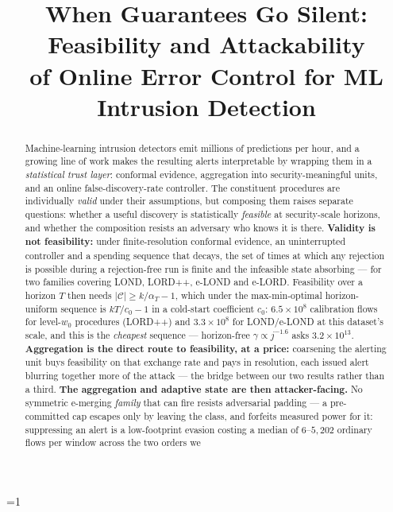 \documentclass[conference]{IEEEtran}
\newcommand{\satmlanon}{1}
\newcommand{\Cal}{\mathcal{C}}
\newcommand{\nCal}{\lvert\Cal\rvert}
\begin{document}
\title{When Guarantees Go Silent: Feasibility and Attackability\\
of Online Error Control for ML Intrusion Detection}

\ifnum\satmlanon=1
  \author{}
\else
  \author{}
\fi

\maketitle

\begin{abstract}
Machine-learning intrusion detectors emit millions of predictions per hour, and a growing line
of work makes the resulting alerts interpretable by wrapping them in a \emph{statistical trust
layer}: conformal evidence, aggregation into security-meaningful units, and an online
false-discovery-rate controller. The constituent procedures are individually \emph{valid} under
their assumptions, but composing them raises separate questions: whether a useful discovery is
statistically \emph{feasible} at security-scale horizons, and whether the composition resists an
adversary who knows it is there.
\textbf{Validity is not feasibility:} under finite-resolution conformal evidence, an uninterrupted
controller and a spending sequence that decays, the set of times at which any rejection is possible
during a rejection-free run is finite and the infeasible state absorbing --- for two families
covering LOND, LORD++, e-LOND and e-LORD. Feasibility over a horizon $T$ then needs
$\nCal \ge k/\alpha_T - 1$, which under the max-min-optimal horizon-uniform sequence is
$kT/c_0 - 1$ in a cold-start coefficient $c_0$: $6.5\times10^{8}$ calibration flows for
level-$w_0$ procedures (LORD++) and $3.3\times10^{8}$ for LOND/e-LOND at this dataset's scale, and
this is the \emph{cheapest} sequence --- horizon-free $\gamma\propto j^{-1.6}$ asks $3.2\times10^{13}$.
\textbf{Aggregation is the direct route to feasibility, at a price:} coarsening the alerting unit
buys feasibility on that exchange rate and pays in resolution, each issued alert blurring
together more of the attack --- the bridge between our two results rather than a third.
\textbf{The aggregation and adaptive state are then attacker-facing.} No symmetric e-merging
\emph{family} that can fire resists adversarial padding --- a pre-committed cap escapes only by
leaving the class, and forfeits measured power for it: suppressing an alert is a low-footprint
evasion costing a median of $6$--$5{,}202$ ordinary flows per window across the two orders we

\end{abstract}
\end{document}
